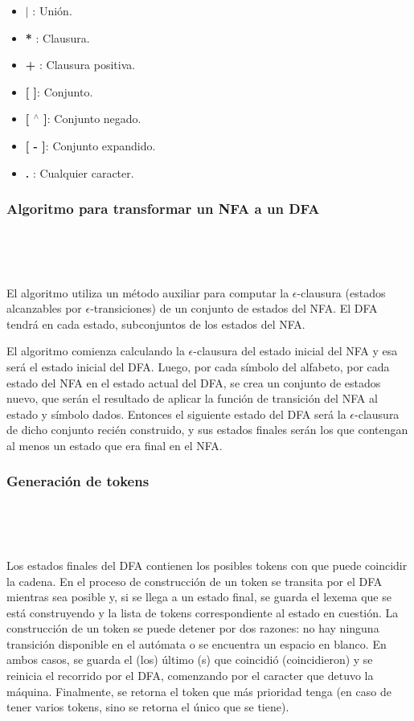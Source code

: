 \documentclass{llncs}
\begin{document}
\begin{itemize}
    \item \textbf{ $|$ }: Unión.
    \item \textbf{ * }: Clausura.
    \item \textbf{ + }: Clausura positiva.
    \item \textbf{[ ]}: Conjunto.
    \item \textbf{[ $^{\wedge}$ ]}: Conjunto negado.
    \item \textbf{[ - ]}: Conjunto expandido.
    \item \textbf{ . }: Cualquier caracter.
\end{itemize}

\subsubsection{Algoritmo para transformar un NFA a un DFA} 

\ 

\

El algoritmo utiliza un método auxiliar para computar la $\epsilon$-clausura (estados alcanzables por
$\epsilon$-transiciones) de un conjunto de estados del NFA. 
El DFA tendrá en cada estado, subconjuntos de los estados del NFA.

El algoritmo comienza calculando la $\epsilon$-clausura del estado inicial del NFA y esa será 
el estado inicial del DFA. Luego, por cada símbolo del alfabeto, por cada estado del NFA en el estado actual del DFA, se crea un conjunto de 
estados nuevo, que serán el resultado de aplicar la función de transición del NFA al estado y símbolo dados. Entonces el siguiente estado del DFA 
será la $\epsilon$-clausura de dicho conjunto recién construido, y sus estados finales serán los que contengan al menos
un estado que era final en el NFA.

\subsubsection{Generación de tokens} 

\ 

\

Los estados finales del DFA contienen los posibles tokens con que puede coincidir la cadena.
En el proceso de construcción de un token se transita por el DFA mientras sea posible y, si se llega a un estado final,
se guarda el lexema que se está construyendo y la lista de tokens correspondiente al estado en cuestión. La construcción de un 
token se puede detener por dos razones: no hay ninguna transición disponible en el autómata o se encuentra un espacio en blanco. En ambos casos, se guarda el (los) último (s) 
que coincidió (coincidieron) y se reinicia el recorrido por el DFA, comenzando por el caracter que detuvo la máquina. Finalmente, se retorna el token que más prioridad tenga (en caso de 
tener varios tokens, sino se retorna el único que se tiene). 
\end{document}
